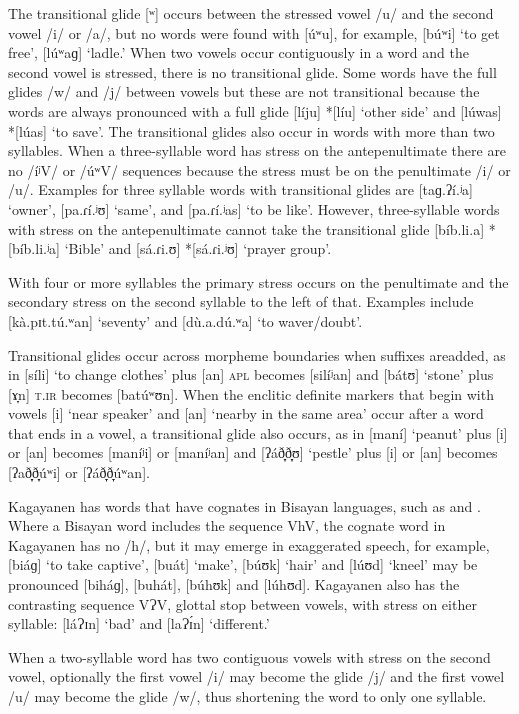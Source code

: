 The transitional glide [ʷ] occurs between the stressed vowel /u/ and the second vowel /i/ or /a/, but no words were found with [úʷu], for example, [búʷi] ‘to get free’, [lúʷaɡ] ‘ladle.’ When two vowels occur contiguously in a word and the second vowel is stressed, there is no transitional glide. Some words have the full glides /w/ and /j/ between vowels but these are not transitional because the words are always pronounced with a full glide [líju] *[líu] ‘other side’ and [lúwas] *[lúas] ‘to save'. The transitional glides also occur in words with more than two syllables. When a three-syllable word has stress on the antepenultimate there are no /íʲV/ or /úʷV/ sequences because the stress must be on the penultimate /i/ or /u/. Examples for three syllable words with transitional glides are [taɡ.ʔí.ʲa] ‘owner’, [pa.ɾí.ʲʊ] ‘same’, and [pa.ɾí.ʲas] ‘to be like’. However, three-syllable words with stress on the antepenultimate cannot take the transitional glide [bíb.li.a] *[bíb.li.ʲa] ‘Bible’ and [sá.ɾi.ʊ] *[sá.ɾi.ʲʊ] ‘prayer group’.

With four or more syllables the primary stress occurs on the penultimate and the secondary stress on the second syllable to the left of that. Examples include [kà.pɪt.tú.ʷan] ‘seventy’ and [dù.a.dú.ʷa] ‘to waver/doubt’.

Transitional glides occur across morpheme boundaries when suffixes are\linebreak{}added, as in [síli] ‘to change clothes’ plus [an] \textsc{apl} becomes [silíʲan] and [bátʊ] ‘stone’ plus [ɤ̞n] \textsc{t.ir} becomes [batúʷʊn]. When the enclitic definite markers that begin with vowels [i] ‘near speaker’ and [an] ‘nearby in the same area’ occur after a word that ends in a vowel, a transitional glide also occurs, as in [maní] ‘peanut’ plus [i] or [an] becomes [maníʲi] or [maníʲan] and [ʔáð̞̞ð̞̞ʊ] ‘pestle’ plus [i] or [an] becomes [ʔað̞̞ð̞̞úʷi] or [ʔáð̞̞ð̞̞úʷan].

Kagayanen has words that have cognates in Bisayan languages, such as  and . Where a Bisayan word includes the sequence VhV, the cognate word in Kagayanen has no /h/, but it may emerge in exaggerated speech, for example, [biáɡ] ‘to take captive’, [buát] ‘make’, [búʊk] ‘hair’ and [lúʊd] ‘kneel’ may be pronounced [biháɡ], [buhát], [búhʊk] and [lúhʊd]. Kagayanen also has the contrasting sequence VɁV, glottal stop between vowels, with stress on either syllable: [láɁɪn] ‘bad’ and [laɁɪ́n] ‘different.’

When a two-syllable word has two contiguous vowels with stress on the second vowel, optionally the first vowel /i/ may become the glide /j/ and the first vowel /u/ may become the glide /w/, thus shortening the word to only one syllable.

